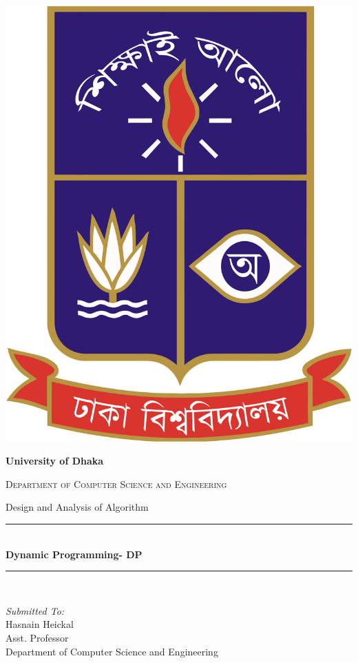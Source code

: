 \documentclass[12pt]{article}
\author{Sakib Hasan}
\begin{document}
\begin{titlepage}
\centering
\vspace{10mm}
\includegraphics[scale = 0.1]{logo.png}\\[1.5 cm]	%
\begin{center}\textbf{\LARGE University of Dhaka}\end{center}
\textsc{\Large Department of Computer Science and Engineering}\\[0.5 cm]
\begin{center} Design and Analysis of Algorithm \end{center}	%
	\rule{\linewidth}{0.2 mm} \\[0.4 cm]
	{ \huge \bfseries{Dynamic Programming- DP}}\\
	\rule{\linewidth}{0.2 mm} \\[1.5 cm]
	
	\begin{minipage}{0.4\textwidth}
		\begin{flushleft} \large
			\emph{Submitted To:}\\
			\vspace{6mm}
			Hasnain Heickal\\
           		 Asst. Professor\\
           		 Department of Computer Science and Engineering\\
			\end{flushleft}
			\end{minipage}~
			\begin{minipage}{0.4\textwidth}
            

\end{minipage}
\end{titlepage}
\end{document}
